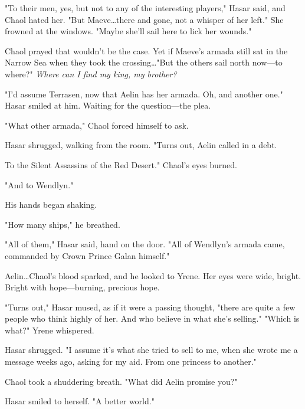 "To their men, yes, but not to any of the interesting players," Hasar said, and Chaol hated her.
"But Maeve\ldots there and gone, not a whisper of her left."
She frowned at the windows.
"Maybe she'll sail here to lick her wounds."

Chaol prayed that wouldn't be the case.
Yet if Maeve's armada still sat in the Narrow Sea when they took the crossing\ldots "But the others sail north now---to where?"
\emph{Where can I find my king, my brother?}

"I'd assume Terrasen, now that Aelin has her armada.
Oh, and another one."
Hasar smiled at him.
Waiting for the question---the plea.

"What other armada," Chaol forced himself to ask.

Hasar shrugged, walking from the room.
"Turns out, Aelin called in a debt.

To the Silent Assassins of the Red Desert."
Chaol's eyes burned.

"And to Wendlyn."

His hands began shaking.

"How many ships," he breathed.

"All of them," Hasar said, hand on the door.
"All of Wendlyn's armada came, commanded by Crown Prince Galan himself."

Aelin\ldots Chaol's blood sparked, and he looked to Yrene.
Her eyes were wide, bright.
Bright with hope---burning, precious hope.

"Turns out," Hasar mused, as if it were a passing thought, "there are quite a few people who think highly of her.
And who believe in what she's selling."
"Which is what?"
Yrene whispered.

Hasar shrugged.
"I assume it's what she tried to sell to me, when she wrote me a message weeks ago, asking for my aid.
From one princess to another."

Chaol took a shuddering breath.
"What did Aelin promise you?"

Hasar smiled to herself.
"A better world."

